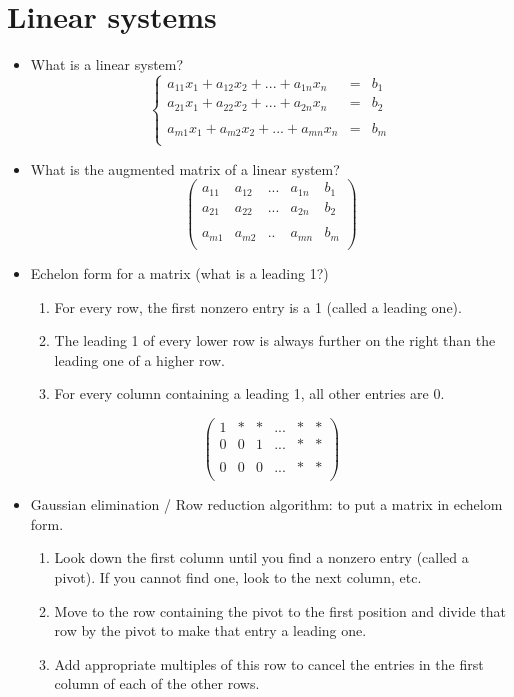 \section{Linear systems}

\begin{itemize}
\item What is a linear system? 
\[ \left\{ 
\begin{array}{ccc} 
a_{11}x_1 + a_{12}x_2 +... + a_{1n}x_n & = & b_1 \\
a_{21}x_1 + a_{22}x_2 +... + a_{2n}x_n & = & b_2 \\
\ & \ & \ \\
a_{m1}x_1 + a_{m2}x_2 +... + a_{mn}x_n & = & b_m \\
\end{array}
\right.
\]
\item What is the augmented matrix of a linear system?
\[ \begin{pmatrix}
a_{11} &  a_{12} & ... & a_{1n}  & b_1 \\
a_{21} &  a_{22} & ... & a_{2n}  &  b_2 \\
\ & \ & \ \\
a_{m1} & a_{m2} & .. & a_{mn} &  b_m \\
\end{pmatrix} \]
\item Echelon form for a matrix (what is a leading 1?)
\begin{enumerate}
\item For every row, the first nonzero entry is a 1 (called a leading one).
\item The leading 1 of every lower row is always further on the right than the leading one of a higher row.
\item For every column containing a leading 1, all other entries are 0.
\end{enumerate}
\[ \begin{pmatrix}
1 &  * & * & ... & *  & *\\
0 &  0 & 1 & ... & *  &  * \\
\ & \ & \ \\
0 &  0 & 0 & ... &  * & * \\
\end{pmatrix} \]
\item Gaussian elimination / Row reduction algorithm: to put a matrix in echelom form.
\begin{enumerate}
\item Look down the first column until you find a nonzero entry (called a pivot). If you cannot find one, look to the next column, etc. 
\item Move to the row containing the pivot to the first position and divide that row by the pivot to make that entry a leading one.
\item Add appropriate multiples of this row to cancel the entries in the first column of each of the other rows.
\end{enumerate}


\end{itemize}
